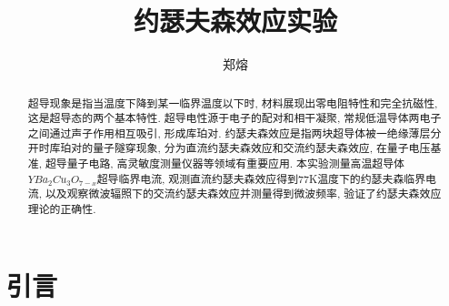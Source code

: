 \documentclass[font=default]{mpltx}
\makeatletter
\newcommand{\note}[1]{{\color{gray}#1}}
\newcommand*\file[1]{\textbf{\texttt{#1}}}
\newcommand\releasedate{%
    \href{https://github.com/CastleStar14654/PKUMpLtX/releases/tag/\mpltx@fileversion}%
        {\mpltx@filedate, \mpltx@fileversion}}
\makeatother
\begin{document}
\title{约瑟夫森效应实验} %
\author{郑熔} %
\date{}
\begin{abstract}
  超导现象是指当温度下降到某一临界温度以下时, 材料展现出零电阻特性和完全抗磁性, 这是超导态的两个基本特性.
  超导电性源于电子的配对和相干凝聚, 常规低温导体两电子之间通过声子作用相互吸引, 形成库珀对.
  约瑟夫森效应是指两块超导体被一绝缘薄层分开时库珀对的量子隧穿现象, 分为直流约瑟夫森效应和交流约瑟夫森效应, 在量子电压基准, 超导量子电路, 高灵敏度测量仪器等领域有重要应用.
  本实验测量高温超导体$YBa_2Cu_3O_{7-x}$超导临界电流, 观测直流约瑟夫森效应得到77K温度下的约瑟夫森临界电流, 以及观察微波辐照下的交流约瑟夫森效应并测量得到微波频率, 验证了约瑟夫森效应理论的正确性.

\end{abstract}

\maketitle

\section{引言}
\end{document}
